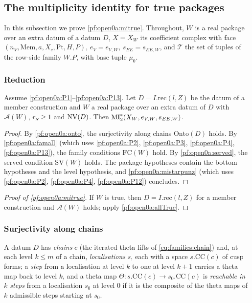 \subsection{The multiplicity identity for true packages}\label{sec:pf:open0a:mi}

In this subsection we prove \cref{pf:open0a:mitrue}. Throughout, $W$ is a real package over an extra datum of a datum
$D$, $X=X_W$ its coefficient complex with face $(n_V,\mathrm{Mem},a,X_c,\mathrm{Pt},H,P)$, $e_V=e_{V,W}$,
$s_{EE}=s_{EE,W}$, and $\mathcal T$ the set of tuples of the row-side family $W.P$, with base tuple $\mu_0$.

\subsubsection{Reduction}

\begin{proposition}\label{pf:open0a:allTrue}
Assume \ref{pf:open0a:P1}--\ref{pf:open0a:P13}. Let $D=I.\mathrm{rec}(l,Z)$ be the datum of a member construction and
$W$ a real package over an extra datum of $D$ with $\mathcal A(W)$, $r_S\ge1$ and $\mathrm{NV}(D)$. Then
$\mathrm{MI}^{*}_{2}(X_W,e_{V,W},s_{EE,W})$.
\
\end{proposition}

\begin{proof}
By \cref{pf:open0a:onto}, the surjectivity along chains $\mathrm{Onto}(D)$ holds. By \cref{pf:open0a:famall} (which
uses \ref{pf:open0a:P2}, \ref{pf:open0a:P3}, \ref{pf:open0a:P4}, \ref{pf:open0a:P13}), the family conditions
$\mathrm{FC}(W)$ hold. By \cref{pf:open0a:served}, the served condition $\mathrm{SV}(W)$ holds. The package hypotheses
contain the bottom hypotheses and the level hypothesis, and \cref{pf:open0a:mistarpunz} (which uses \ref{pf:open0a:P2},
\ref{pf:open0a:P4}, \ref{pf:open0a:P12}) concludes.
\end{proof}

\begin{proof}[Proof of \cref{pf:open0a:mitrue}]
If $W$ is true, then $D=I.\mathrm{rec}(l,Z)$ for a member construction and $\mathcal A(W)$ holds; apply
\cref{pf:open0a:allTrue}.
\end{proof}

\subsubsection{Surjectivity along chains}
A datum $D$ has \emph{chains} $c$ (the iterated theta lifts of \eqref{eq:families:chain}) and, at each level $k\le m$
of a chain, \emph{localisations} $s$, each with a space $s.\mathrm{CC}(c)$ of cusp forms; a \emph{step} from a
localisation at level $k$ to one at level $k+1$ carries a theta map back to level $k$, and a theta map
$\Theta\colon s.\mathrm{CC}(c)\to s_0.\mathrm{CC}(c)$ is \emph{reachable in $k$ steps} from a localisation $s_0$ at
level $0$ if it is the composite of the theta maps of $k$ admissible steps starting at $s_0$.

